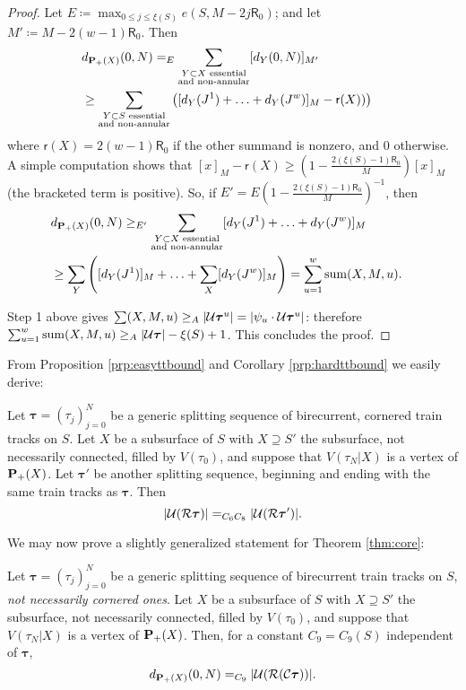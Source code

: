 \begin{proof}
Let $E\coloneqq \max_{0\leq j\leq\xi(S)}e\left(S,M-2j\mathsf{R}_0\right)$; and let $M'\coloneqq M-2(w-1)\mathsf{R}_0$. Then
\begin{eqnarray*}
 & d_{{\mathbf{P}_+}(X)}(0,N)=_E \sum_{\substack{Y\subset X\text{ essential} \\ \text{and non-annular}}} [d_Y(0,N)]_{M'} & \\
 & \geq \sum_{\substack{Y\subset S\text{ essential} \\ \text{and non-annular}}} \left([d_Y(J^1) + \ldots + d_Y(J^w)]_M-\mathsf r(X))\right)
\end{eqnarray*}
where $\mathsf r(X)=2(w-1)\mathsf{R}_0$ if the other summand is nonzero, and $0$ otherwise. A simple computation shows that $[x]_M-\mathsf r(X)\geq \left(1-\frac{2(\xi(S)-1)\mathsf{R}_0}{M}\right)[x]_M$ (the bracketed term is positive). So, if $E'=E\left(1-\frac{2(\xi(S)-1)\mathsf{R}_0}{M}\right)^{-1}$, then
\begin{eqnarray*}
 & d_{{\mathbf{P}_+}(X)}(0,N) \geq_{E'} \sum_{\substack{Y\subset X\text{ essential} \\ \text{and non-annular}}} [d_Y(J^1) + \ldots + d_Y(J^w)]_M & \\
 & \geq \sum_Y \left([d_Y(J^1)]_M + \ldots + \sum_X [d_Y(J^w)]_M\right) =\sum_{u=1}^w \mathrm{sum}(X,M,u). &
\end{eqnarray*}

Step 1 above gives $\sum(X,M,u)\geq_A |{\mathcal U}\bm\tau^u|=|\psi_u\cdot {\mathcal U}\bm\tau^u|$: therefore\linebreak $\sum_{u=1}^w \mathrm{sum}(X,M,u)\geq_A |{\mathcal U}\bm\tau|-\xi(S)+1$. This concludes the proof.
\end{proof}

From Proposition \ref{prp:easyttbound} and Corollary \ref{prp:hardttbound} we easily derive:
\begin{coroll}\label{cor:ttsamelength}
Let $\bm\tau=(\tau_j)_{j=0}^N$ be a generic splitting sequence of birecurrent, cornered train tracks on $S$. Let $X$ be a subsurface of $S$ with $X\supseteq S'$ the subsurface, not necessarily connected, filled by $V(\tau_0)$, and suppose that $V(\tau_N|X)$ is a vertex of ${\mathbf{P}_+}(X)$. Let $\bm\tau'$ be another splitting sequence, beginning and ending with the same train tracks as $\bm\tau$. Then
$$
|{\mathcal U}({\mathcal R}\bm\tau)| =_{C_6C_8} |{\mathcal U}({\mathcal R}\bm\tau')|.
$$
\end{coroll}

We may now prove a slightly generalized statement for Theorem \ref{thm:core}:

\begin{theo}\label{thm:main_full}
Let $\bm\tau=(\tau_j)_{j=0}^N$ be a generic splitting sequence of birecurrent train tracks on $S$, \emph{not necessarily cornered ones}. Let $X$ be a subsurface of $S$ with $X\supseteq S'$ the subsurface, not necessarily connected, filled by $V(\tau_0)$, and suppose that $V(\tau_N|X)$ is a vertex of ${\mathbf{P}_+}(X)$. Then, for a constant $C_9=C_9(S)$ independent of $\bm\tau$,
$$d_{{\mathbf{P}_+}(X)}(0,N)=_{C_9} |{\mathcal U}({\mathcal R}({\mathcal C}\bm\tau))|.$$
\end{theo}

